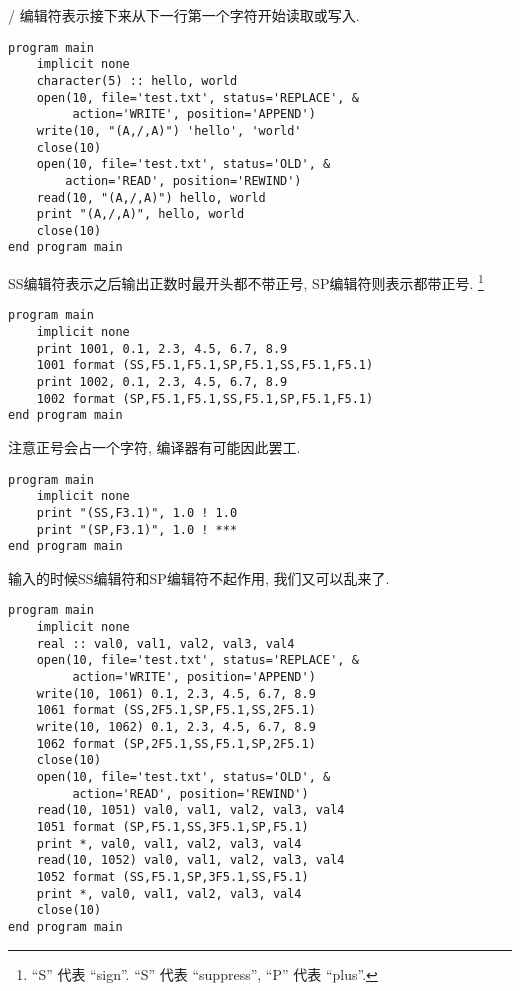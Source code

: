 / 编辑符表示接下来从下一行第一个字符开始读取或写入. 
\begin{lstlisting}
program main
    implicit none
    character(5) :: hello, world
    open(10, file='test.txt', status='REPLACE', &
         action='WRITE', position='APPEND')
    write(10, "(A,/,A)") 'hello', 'world'
    close(10)
    open(10, file='test.txt', status='OLD', &
        action='READ', position='REWIND')
    read(10, "(A,/,A)") hello, world
    print "(A,/,A)", hello, world
    close(10)
end program main
\end{lstlisting}

SS编辑符表示之后输出正数时最开头都不带正号, SP编辑符则表示都带正号. \footnote{``S'' 代表 ``sign''.  ``S'' 代表 ``suppress'', ``P'' 代表 ``plus''.}
\begin{lstlisting}
program main
    implicit none
    print 1001, 0.1, 2.3, 4.5, 6.7, 8.9
    1001 format (SS,F5.1,F5.1,SP,F5.1,SS,F5.1,F5.1)
    print 1002, 0.1, 2.3, 4.5, 6.7, 8.9
    1002 format (SP,F5.1,F5.1,SS,F5.1,SP,F5.1,F5.1)
end program main
\end{lstlisting}
注意正号会占一个字符, 编译器有可能因此罢工. 
\begin{lstlisting}
program main
    implicit none
    print "(SS,F3.1)", 1.0 ! 1.0
    print "(SP,F3.1)", 1.0 ! ***
end program main
\end{lstlisting}
输入的时候SS编辑符和SP编辑符不起作用, 我们又可以乱来了. 
\begin{lstlisting}
program main
    implicit none
    real :: val0, val1, val2, val3, val4
    open(10, file='test.txt', status='REPLACE', &
         action='WRITE', position='APPEND')
    write(10, 1061) 0.1, 2.3, 4.5, 6.7, 8.9
    1061 format (SS,2F5.1,SP,F5.1,SS,2F5.1)
    write(10, 1062) 0.1, 2.3, 4.5, 6.7, 8.9
    1062 format (SP,2F5.1,SS,F5.1,SP,2F5.1)
    close(10)
    open(10, file='test.txt', status='OLD', &
         action='READ', position='REWIND')
    read(10, 1051) val0, val1, val2, val3, val4
    1051 format (SP,F5.1,SS,3F5.1,SP,F5.1)
    print *, val0, val1, val2, val3, val4
    read(10, 1052) val0, val1, val2, val3, val4
    1052 format (SS,F5.1,SP,3F5.1,SS,F5.1)
    print *, val0, val1, val2, val3, val4
    close(10)
end program main
\end{lstlisting}

